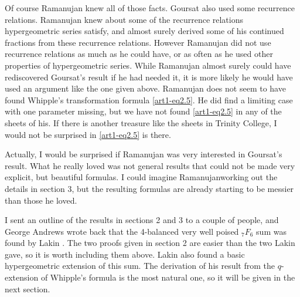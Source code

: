 Of course Ramanujan knew all of those facts. Goursat also used some recurrence relations. Ramanujan knew about some of the recurrence relations hypergeometric series satisfy, and almost surely derived some of his continued fractions from these recurrence relations. However Ramanujan did not use recurrence relations as much as he could have, or as often as he used other properties of hypergeometric series. While  Ramanujan almost surely could have rediscovered Goursat's result if he had needed it, it is more likely he would have used an argument like the one given above. Ramanujan does not seem to have found Whipple's transformation formula \eqref{art1-eq2.5}. He did find a limiting case with one parameter missing, but we have not found \eqref{art1-eq2.5} in any of the sheets of his. If there is another treasure like the sheets in Trinity College, I would not be surprised in \eqref{art1-eq2.5} is there.

Actually, I would be surprised if Ramanujan was very interested in Goursat's result. What he really loved was not general results that could not be made very explicit, but beautiful formulas. I could imagine Ramanujan\pageoriginale working out the details in section 3, but the resulting formulas are already starting to be messier than those he loved.
 
I sent an outline of the results in sections 2 and 3 to a couple of people, and George Andrews wrote back that the 4-balanced very well poised ${}_7 F_6$ sum was found by Lakin \cite{art1-key9}. The two proofs given in section 2 are easier than the two Lakin gave, so it is worth including them above. Lakin also found a basic hypergeometric extension of this sum. The derivation of his result from the $q$-extension of Whipple's formula is the most natural one, so it will be given in the next section.

